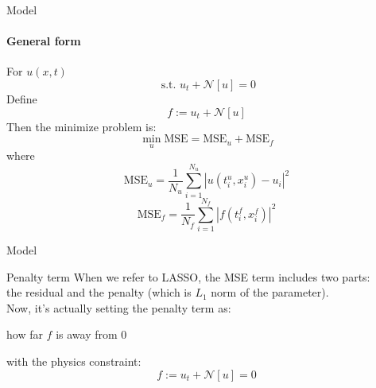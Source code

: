 \begin{frame}{Model}
    \framesubtitle{General form}
        For \( u(x,t) \)
        \begin{equation}
        \text{ s.t. } u_t + \mathcal{N}[u] = 0
        \end{equation}
        Define  
        \begin{equation}
        f := u_t + \mathcal{N}[u]
        \end{equation}
        Then the minimize problem is:
        \begin{equation}
        \min\limits_{u} \text{MSE} = \text{MSE}_u + \text{MSE}_f
        \end{equation}
        where
        \begin{equation}
        \text{MSE}_u = \frac{1}{N_u} \sum_{i=1}^{N_u} | u(t_i^u, x_i^u) - u_i |^2
        \end{equation}
        \begin{equation}
        \text{MSE}_f = \frac{1}{N_f} \sum_{i=1}^{N_f} | f(t_i^f, x_i^f) |^2
        \end{equation}
    \end{frame}
    
    \begin{frame}{Model}
        \begin{block}{Penalty term}
        When we refer to LASSO, the MSE term includes two parts:\\
        the residual and the penalty (which is \( L_1 \) norm of the parameter).\\
        Now, it's actually setting the penalty term as:\\
        \begin{center}
        how far \( f \) is away from 0\\
        \end{center}
        with the physics constraint: 
        \begin{equation}
        f := u_t + \mathcal{N}[u]=0
        \end{equation}
        \end{block}
    \end{frame}
    
